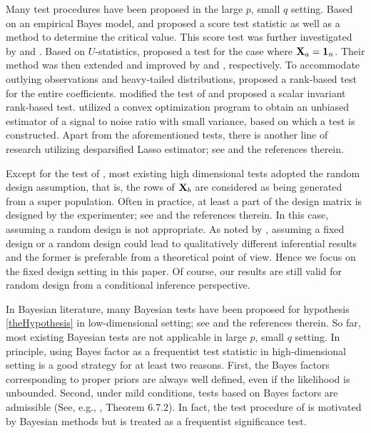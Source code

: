 \documentclass[smallextended]{svjour3}       %
\begin{document}
Many test procedures have been proposed in the large $p$, small $q$ setting.
Based on an empirical Bayes model, \cite{Goeman2006} and \cite{Goeman2011} proposed a score test statistic as well as a method to determine the critical value.
This score test was further investigated by \cite{Lan2014Testing} and \cite{Lan2016a}.
Based on $U$-statistics, \cite{Zhong2011Tests} proposed a test for the case where $\mathbf{X}_a=\mathbf 1_n$.
Their method was then extended and improved by \cite{Wang2015} and \cite{Cui2018}, respectively.
To accommodate outlying observations and heavy-tailed distributions, \cite{Feng2013}
proposed a rank-based test for the entire coefficients.
\cite{Xu2016a} modified the test of \cite{Feng2013} and proposed a scalar invariant rank-based test.
\cite{Janson2016} utilized a convex optimization program to obtain an unbiased estimator of a signal to noise ratio with small variance, based on which a test is constructed.
Apart from the aforementioned tests,
there is another line of research utilizing desparsified Lasso estimator; see \cite{Dezeure2017} and the references therein.

Except for the test of \cite{Goeman2006}, most existing high dimensional tests adopted the random design assumption, that is, the rows of $\mathbf{X}_b$ are considered as being generated from a super population.
Often in practice, at least a part of the design matrix is designed by the experimenter; see \cite{Draper1996} and the references therein.
In this case, assuming a random design is not appropriate.
As noted by \cite{Lei2018}, assuming a fixed design or a random design could lead to qualitatively different inferential results and the former is preferable from a theoretical point of view.
Hence we focus on the fixed design setting in this paper.
Of course, our results are still valid for random design from a conditional inference perspective.




In Bayesian literature, many Bayesian tests have been proposed for hypothesis \eqref{theHypothesis} in low-dimensional setting; see \cite{javier2006Obj,Goddard2016,zhou2018On} and the references therein.
So far, most existing Bayesian tests are not applicable in large $p$, small $q$ setting.
In principle,
using Bayes factor as a frequentist test statistic in high-dimensional setting is a good strategy for at least two reasons.
First, the Bayes factors corresponding to proper priors are always well defined, even if the likelihood is unbounded.
Second, under mild conditions, tests based on Bayes factors are admissible (See, e.g., \cite{Lehmann}, Theorem 6.7.2).
In fact, the test procedure of \cite{Goeman2006} is motivated by Bayesian methods but is treated as a frequentist significance test.
\end{document}
